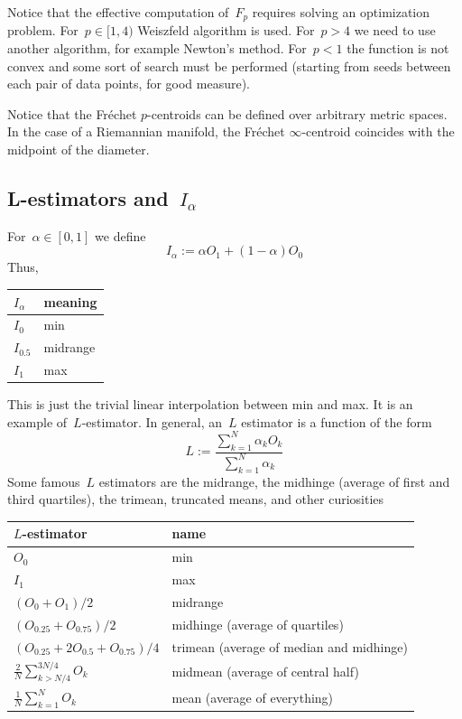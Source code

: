 Notice that the effective computation of~$F_p$ requires solving an
optimization problem.  For~$p\in[1,4)$ Weiszfeld
algorithm is used.  For~$p>4$ we need to use another algorithm, for
example Newton's method.  For~$p<1$ the function is not convex and
some sort of search must be performed (starting from seeds between
each pair of data points, for good measure).

Notice that the Fréchet $p$-centroids can be defined over arbitrary
metric spaces.  In the case of a Riemannian manifold, the Fréchet
$\infty$-centroid coincides with the midpoint of the diameter.

\medskip

\subsection{L-estimators and~$I_\alpha$}

For~$\alpha\in[0,1]$ we define
\[
	I_{\alpha}:=\alpha O_1 + (1-\alpha) O_0
\]
Thus,
\medskip

\begin{tabular}{l|l}
	$I_\alpha$ & meaning \\
	\hline
	$I_0$ & min \\
	$I_{0.5}$ & midrange \\
	$I_1$ & max \\
\end{tabular}

This is just the trivial linear interpolation between min and max.
It is an example of~$L$-estimator.  In general, an~$L$ estimator is a
function of the form
\[
	L := \frac{\sum_{k=1}^N{\alpha_kO_k}}{\sum_{k=1}^N{\alpha_k}}
\]
Some famous~$L$ estimators are the midrange, the midhinge (average of
first and third quartiles), the trimean, truncated means, and other curiosities

\medskip

\begin{tabular}{l|l}
	$L$-estimator & name \\
	\hline
	$O_0$ & min \\
	$I_1$ & max \\
	$(O_0+O_1)/2$ & midrange \\
	$(O_{0.25}+O_{0.75})/2$ & midhinge (average of quartiles) \\
	$(O_{0.25}+2O_{0.5}+O_{0.75})/4$ & trimean (average of median
	and midhinge) \\
	$\frac{2}{N}\sum_{k>N/4}^{3N/4} O_k$ & midmean (average of
	central half) \\
	$\frac{1}{N}\sum_{k=1}^{N} O_k$ & mean (average of
	everything)
\end{tabular}

